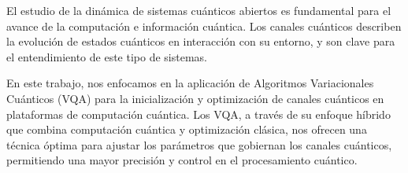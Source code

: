 \documentclass[letterpaper,12pt]{thesisECFM}
\theoremstyle{plain}
\theoremstyle{definition}
\theoremstyle{definition}
\theoremstyle{remark}
\newcommand{\1}{\mathbb{1}}
\begin{document}
El estudio de la dinámica de sistemas cuánticos abiertos es fundamental para el avance de la computación e información cuántica. Los canales cuánticos describen la evolución de estados cuánticos en  interacción con su entorno, y son clave para el entendimiento de este tipo de sistemas.

En este trabajo, nos enfocamos en la aplicación de Algoritmos Variacionales Cuánticos (VQA) para la inicialización y optimización de canales cuánticos en plataformas de computación cuántica. Los VQA, a través de su enfoque híbrido que combina computación cuántica y optimización clásica, nos ofrecen una técnica óptima para ajustar los parámetros que gobiernan los canales cuánticos, permitiendo una mayor precisión y control en el procesamiento cuántico.

 
\end{document}
